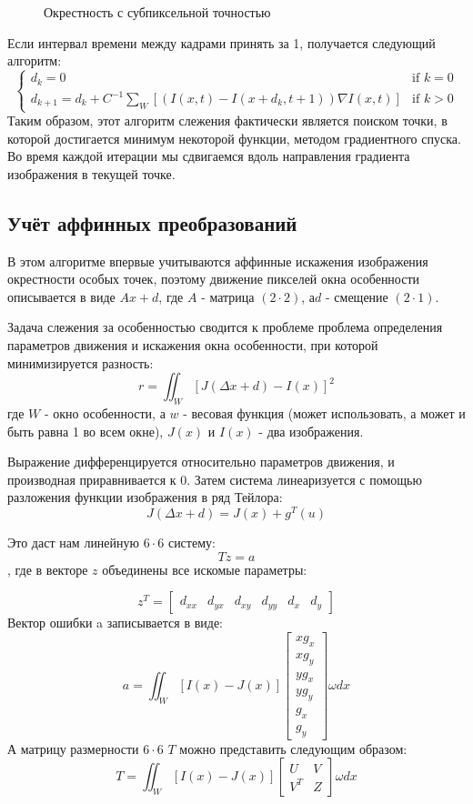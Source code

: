 \begin{figure}[ht]
\caption{Окрестность с субпиксельной точностью}
\label{pic:grid}
\end{figure}

Если интервал времени между кадрами принять за 1, получается следующий алгоритм:
$$\begin{cases} d_k = 0 &\mbox{if } k = 0 \\
d_{k+1}=d_k + C^{-1} \sum_W \left[ (I(x,t) - I(x+d_k,t + 1)) \nabla I (x,t) \right] & \mbox{if } k > 0 \end{cases}
$$
Таким образом, этот алгоритм слежения фактически является поиском точки, в которой достигается минимум некоторой функции, методом градиентного спуска. Во время каждой итерации мы сдвигаемся вдоль направления градиента изображения в текущей точке.
\subsection{Учёт аффинных преобразований}

В этом алгоритме впервые учитываются аффинные искажения изображения окрестности особых точек, поэтому движение пикселей окна особенности описывается в виде $Ax + d$, где $A$ - матрица $(2 \cdot 2)$, $а d$ - смещение $(2 \cdot 1)$.

Задача слежения за особенностью сводится к проблеме проблема определения параметров движения и искажения окна особенности, при которой минимизируется разность:
$$r=\iint_W [J(\Delta x+d)-I(x)]^2$$
где $W$ - окно особенности, а $w$ - весовая функция (может использовать, а может и быть равна 1 во всем окне), $J(x)$ и $I(x)$ - два изображения.

Выражение дифференцируется относительно параметров движения, и производная приравнивается к 0. Затем система линеаризуется с помощью разложения функции изображения в ряд Тейлора:
$$J(\Delta x+d)= J(x)+g^T(u)$$

Это даст нам линейную $6 \cdot 6$ систему:
$$Tz=a$$
, где в векторе $z$ объединены все искомые параметры:

$$z^T=\begin{bmatrix}
 d_{xx} & d_{yx} & d_{xy} & d_{yy} & d_x & d_y
\end{bmatrix}$$
Вектор ошибки a записывается в виде:
$$a=\iint_W [I(x)-J(x)]\begin{bmatrix}
xg_x\\
xg_y\\
yg_x\\
yg_y\\
g_x\\
g_y
\end{bmatrix}\omega dx$$
А матрицу размерности $6 \cdot 6$ $T$ можно представить следующим образом:
$$T=\iint_W [I(x)-J(x)]\begin{bmatrix}
U & V\\
V^T & Z
\end{bmatrix}\omega dx$$

